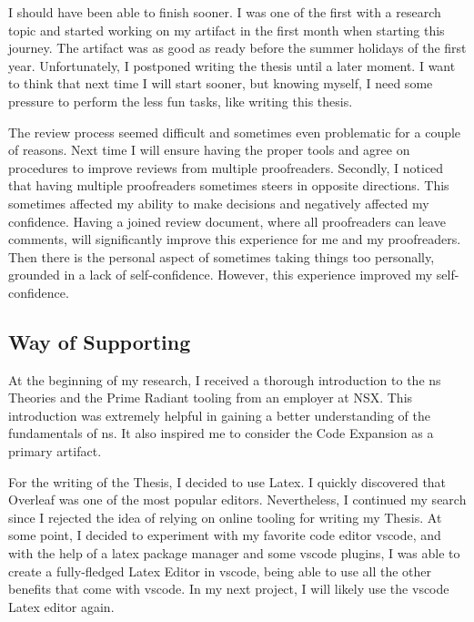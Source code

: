 I should have been able to finish sooner. I was one of the first with a research topic and
started working on my artifact in the first month when starting this journey. The artifact
was as good as ready before the summer holidays of the first year. Unfortunately, I
postponed writing the thesis until a later moment. I want to think that next time I will
start sooner, but knowing myself, I need some pressure to perform the less fun tasks, like
writing this thesis.

The review process seemed difficult and sometimes even problematic for a couple of
reasons. Next time I will ensure having the proper tools and agree on procedures to
improve reviews from multiple proofreaders. Secondly, I noticed that having multiple
proofreaders sometimes steers in opposite directions. This sometimes affected my ability
to make decisions and negatively affected my confidence. Having a joined review document,
where all proofreaders can leave comments, will significantly improve this experience for
me and my proofreaders. Then there is the personal aspect of sometimes taking things too
personally, grounded in a lack of self-confidence. However, this experience improved my
self-confidence. 

\subsection{Way of Supporting}

At the beginning of my research, I received a thorough introduction to the \gls{ns}
Theories and the Prime Radiant tooling from an employer at NSX. This introduction was
extremely helpful in gaining a better understanding of the fundamentals of \gls{ns}. It
also inspired me to consider the Code Expansion as a primary artifact. 

For the writing of the Thesis, I decided to use Latex. I quickly discovered that Overleaf
was one of the most popular editors. Nevertheless, I continued my search since I rejected
the idea of relying on online tooling for writing my Thesis. At some point, I decided to
experiment with my favorite code editor \gls{vscode}, and with the help of a latex package
manager and some \gls{vscode} plugins, I was able to create a fully-fledged Latex Editor
in \gls{vscode}, being able to use all the other benefits that come with \gls{vscode}. In
my next project, I will likely use the \gls{vscode} Latex editor again.
